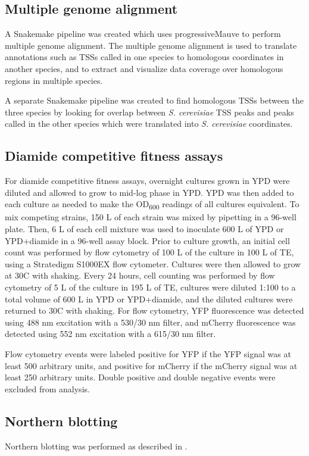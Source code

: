 \subsection{Multiple genome alignment}

A Snakemake pipeline was created which uses progressiveMauve \citep{darling2010} to perform multiple genome alignment.
The multiple genome alignment is used to translate annotations such as TSSs called in one species to homologous coordinates in another species, and to extract and visualize data coverage over homologous regions in multiple species.

A separate Snakemake pipeline was created to find homologous TSSs between the three species by looking for overlap between \textit{S. cerevisiae} TSS peaks and peaks called in the other species which were translated into \textit{S. cerevisiae} coordinates.

\subsection{Diamide competitive fitness assays}

For diamide competitive fitness assays, overnight cultures grown in YPD were diluted and allowed to grow to mid-log phase in YPD.
YPD was then added to each culture as needed to make the OD\textsubscript{600} readings of all cultures equivalent.
To mix competing strains, 150 \textmu L of each strain was mixed by pipetting in a 96-well plate.
Then, 6 \textmu L of each cell mixture was used to inoculate 600 \textmu L of YPD or YPD+diamide in a 96-well assay block.
Prior to culture growth, an initial cell count was performed by flow cytometry of 100 \textmu L of the culture in 100 \textmu L of TE, using a Stratedigm S1000EX flow cytometer.
Cultures were then allowed to grow at 30\textdegree C with shaking.
Every 24 hours, cell counting was performed by flow cytometry of 5 \textmu L of the culture in 195 \textmu L of TE, cultures were diluted 1:100 to a total volume of 600 \textmu L in YPD or YPD+diamide, and the diluted cultures were returned to 30\textdegree C with shaking.
For flow cytometry, YFP fluorescence was detected using 488 nm excitation with a 530/30 nm filter, and mCherry fluorescence was detected using 552 nm excitation with a 615/30 nm filter.

Flow cytometry events were labeled positive for YFP if the YFP signal was at least 500 arbitrary units, and positive for mCherry if the mCherry signal was at least 250 arbitrary units.
Double positive and double negative events were excluded from analysis.

\subsection{Northern blotting}

Northern blotting was performed as described in \citet{degennaro2013}.

\newpage

\begingroup
\singlespacing

\endgroup
